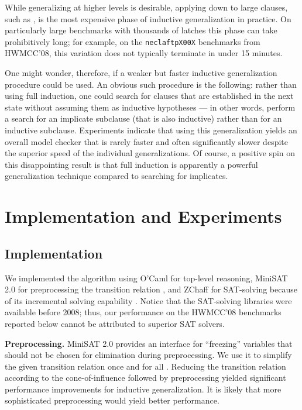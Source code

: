\documentclass{llncs}
\begin{document}
While generalizing at higher levels is desirable, applying {\sf down}
to large clauses, such as , is the most expensive phase of
inductive generalization in practice.  On particularly large
benchmarks with thousands of latches this phase can take prohibitively
long; for example, on the {\tt neclaftpX00X} benchmarks from HWMCC'08,
this variation does not typically terminate in under 15 minutes.

One might wonder, therefore, if a weaker but faster inductive
generalization procedure could be used.  An obvious such procedure is
the following: rather than using full induction, one could search for
clauses that are established in the next state without assuming them
as inductive hypotheses --- in other words, perform a search for an
implicate subclause (that is also inductive) rather than for an
inductive subclause.  Experiments indicate that using this
generalization yields an overall model checker that is rarely faster
and often significantly slower despite the superior speed of the
individual generalizations.  Of course, a positive spin on this
disappointing result is that full induction is apparently a powerful
generalization technique compared to searching for implicates.

\section{Implementation and Experiments}
\label{sec:exp}

\subsection{Implementation}

We implemented the algorithm using O'Caml for top-level reasoning,
MiniSAT 2.0 for preprocessing the transition relation
\cite{Een+Biere/2005}, and ZChaff for SAT-solving because of its
incremental solving capability \cite{Moskewicz+Others/2001}.  Notice
that the SAT-solving libraries were available before 2008; thus, our
performance on the HWMCC'08 benchmarks reported below cannot be
attributed to superior SAT solvers.

{\bf Preprocessing.}  MiniSAT 2.0 provides an interface for
``freezing'' variables that should not be chosen for elimination
during preprocessing.  We use it to simplify the given transition
relation once and for all \cite{Een+Others/2007}.  Reducing the
transition relation according to the cone-of-influence
\cite{Clarke+Others:MC:2000} followed by preprocessing yielded
significant performance improvements for inductive generalization.  It
is likely that more sophisticated preprocessing would yield better
performance.
\end{document}
